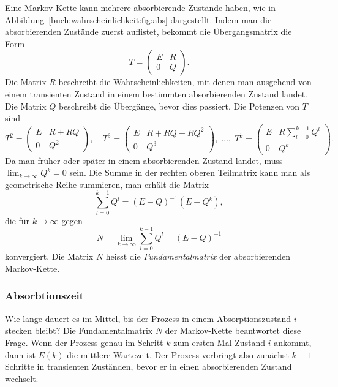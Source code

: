 Eine Markov-Kette kann mehrere absorbierende Zustände haben, wie in
Abbildung~\ref{buch:wahrscheinlichkeit:fig:abs} dargestellt.
Indem man die absorbierenden Zustände zuerst auflistet, bekommt die 
Übergangsmatrix die Form
\[
T=
\left(
\begin{array}{c|c}
E&R\\
\hline
0&Q
\end{array}
\right).
\]
Die Matrix $R$ beschreibt die Wahrscheinlichkeiten, mit denen man
ausgehend von einem transienten Zustand
in einem bestimmten absorbierenden Zustand landet.
Die Matrix $Q$ beschreibt die Übergänge, bevor dies passiert.
Die Potenzen von $T$ sind
\[
T^2
=
\left(
\begin{array}{c|c}
E&R+RQ \\
\hline
0&Q^2
\end{array}
\right),
\quad
T^3
=
\left(
\begin{array}{c|c}
E&R+RQ+RQ^2 \\
\hline
0&Q^3
\end{array}
\right),
\;
\dots,
\;
T^k
=
\left(
\begin{array}{c|c}
E&\displaystyle R\sum_{l=0}^{k-1} Q^l \\
\hline
0&Q^k
\end{array}
\right).
\]
Da man früher oder später in einem absorbierenden Zustand landet,
muss $\lim_{k\to\infty} Q^k=0$ sein.
Die Summe in der rechten oberen Teilmatrix kann man als geometrische
Reihe summieren, man erhält die Matrix
\[
\sum_{l=0}^{k-1} Q^l = (E-Q)^{-1}(E-Q^k),
\]
die für $k\to\infty$ gegen
\[
N
=
\lim_{k\to\infty} \sum_{l=0}^{k-1} Q^l
=
(E-Q)^{-1}
\]
konvergiert.
Die Matrix $N$ heisst die {\em Fundamentalmatrix} der absorbierenden
Markov-Kette.
%

\subsubsection{Absorbtionszeit}
Wie lange dauert es im Mittel, bis der Prozess in einem
Absorptionszustand $i$ stecken bleibt?
Die Fundamentalmatrix $N$ der Markov-Kette beantwortet diese
Frage.
Wenn der Prozess genau im Schritt $k$ zum ersten Mal Zustand $i$
ankommt, dann ist $E(k)$ die mittlere Wartezeit.
Der Prozess verbringt also zunächst $k-1$ Schritte in transienten
Zuständen, bevor er in einen absorbierenden Zustand wechselt.

